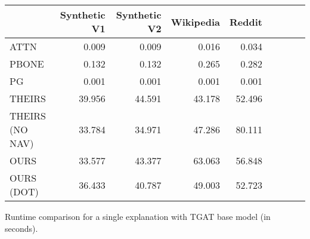 \begin{tabular}{lrrrrrrrr}
\toprule
 & Synthetic V1 & Synthetic V2 & Wikipedia & Reddit \\
\midrule
ATTN & 0.009 & 0.009 & 0.016 & 0.034 \\
PBONE & 0.132 & 0.132 & 0.265 & 0.282 \\
PG & 0.001 & 0.001 & 0.001 & 0.001 \\
THEIRS & 39.956 & 44.591 & 43.178 & 52.496 \\
THEIRS (NO NAV) & 33.784 & 34.971 & 47.286 & 80.111 \\
OURS & 33.577 & 43.377 & 63.063 & 56.848 \\
OURS (DOT) & 36.433 & 40.787 & 49.003 & 52.723 \\
\bottomrule
\end{tabular}
\caption{\label{tab:tgat_runtime}Runtime comparison for a single explanation with TGAT base model (in seconds).}
